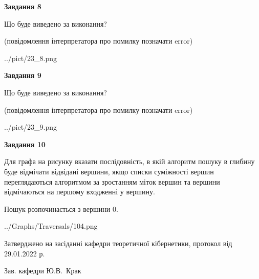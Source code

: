 \documentclass[12pt, ukrainian]{article}
\begin{document}
{\begin {large}
{\begin {center}\textbf{Завдання 8}\end {center}}\par
Що буде виведено за виконання?\par
 (повідомлення інтерпретатора про помилку позначати error)\par
\begin{center}
	{../pict/23_8.png}
\end{center}
\newpage

{\begin {center}\textbf{Завдання 9}\end {center}}\par
Що буде виведено за виконання?\par
 (повідомлення інтерпретатора про помилку позначати error)\par
\begin{center}
	{../pict/23_9.png}
\end{center}
\newpage

{\begin {center}\textbf{Завдання 10}\end {center}}\par
Для графа на рисунку вказати послідовність, в якій алгоритм пошуку в глибину буде відмічати відвідані вершини, якщо списки суміжності вершин переглядаються алгоритмом за зростанням міток вершин та вершини відмічаються на першому вход\-женні у вершину.\par
Пошук розпочинається з вершини 0.\par

\begin{center}
	{../Graphs/Traversals/104.png}
\end{center}\par
\newpage


\end {large}
}
{\smallskip \begin {small} Затверджено на засіданні кафедри теоретичної кібернетики, протокол  від   29.01.2022 р.\par\smallskip\smallskip
{\parbox {6.5 cm}{Зав. кафедри \dotfill Ю.В.~Крак}} \end{small}}
\end{document}
